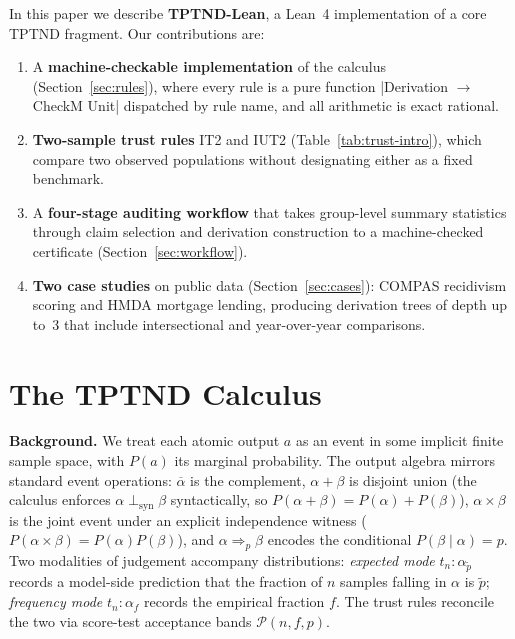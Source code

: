 \documentclass{ceurart}
\newcommand{\CI}{\mathcal{P}}
\begin{document}
In this paper we describe \textbf{TPTND-Lean}, a Lean~4 implementation
of a core TPTND fragment.  Our contributions are:
%
\begin{enumerate}
\item A \textbf{machine-checkable implementation} of the calculus
  (Section~\ref{sec:rules}), where every
  rule is a pure function |Derivation $\to$ CheckM Unit|
  dispatched by rule name, and all arithmetic is exact rational.
\item \textbf{Two-sample trust rules} \textsc{IT2} and \textsc{IUT2}
  (Table~\ref{tab:trust-intro}), which compare two observed
  populations without designating either as a fixed benchmark.
\item A \textbf{four-stage auditing workflow} that takes group-level
  summary statistics through claim selection and derivation
  construction to a machine-checked certificate
  (Section~\ref{sec:workflow}).
\item \textbf{Two case studies} on public data
  (Section~\ref{sec:cases}): COMPAS recidivism scoring and HMDA
  mortgage lending, producing derivation trees of depth up to~3
  that include intersectional and year-over-year comparisons.
\end{enumerate}

\section{The TPTND Calculus}\label{sec:calculus}

\smallskip\noindent
\textbf{Background.}
We treat each atomic output $a$ as an event in some implicit
finite sample space, with $P(a)$ its marginal probability.  The
output algebra mirrors standard event operations:
$\overline\alpha$ is the complement, $\alpha+\beta$ is disjoint
union (the calculus enforces $\alpha \perp_{\text{syn}} \beta$
syntactically, so $P(\alpha+\beta) = P(\alpha) + P(\beta)$),
$\alpha \times \beta$ is the joint event under an explicit
independence witness ($P(\alpha\times\beta) = P(\alpha)P(\beta)$),
and $\alpha \Rightarrow_p \beta$ encodes the conditional
$P(\beta\mid\alpha) = p$.  Two modalities of judgement accompany
distributions: \emph{expected mode} $t_n:\alpha_{\tilde p}$
records a model-side prediction that the fraction of $n$ samples
falling in $\alpha$ is $\tilde p$; \emph{frequency mode}
$t_n:\alpha_f$ records the empirical fraction $f$.  The trust
rules reconcile the two via score-test acceptance bands
$\CI(n,f,p)$.
\end{document}
